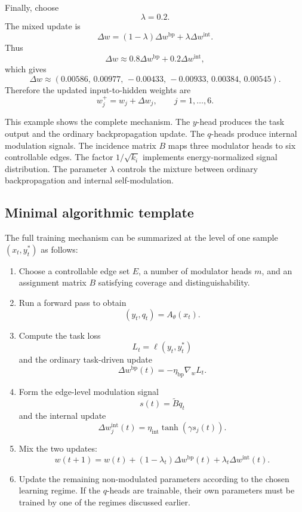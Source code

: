 \documentclass[11pt]{article}
\newcommand{\1}{\mathbf{1}}
\begin{document}
Finally, choose
\[
\lambda=0.2.
\]
The mixed update is
\[
\Delta w
=
(1-\lambda)\Delta w^{\mathrm{bp}}
+
\lambda \Delta w^{\mathrm{int}}.
\]
Thus
\[
\Delta w
\approx
0.8\Delta w^{\mathrm{bp}}
+
0.2\Delta w^{\mathrm{int}},
\]
which gives
\[
\Delta w
\approx
\left(
0.00586,\,
0.00977,\,
-0.00433,\,
-0.00933,\,
0.00384,\,
0.00545
\right).
\]
Therefore the updated input-to-hidden weights are
\[
w_j^+
=
w_j+\Delta w_j,
\qquad
j=1,\dots,6.
\]

This example shows the complete mechanism. The \(y\)-head produces the task output and the ordinary backpropagation update. The \(q\)-heads produce internal modulation signals. The incidence matrix \(B\) maps three modulator heads to six controllable edges. The factor \(1/\sqrt{k_i}\) implements energy-normalized signal distribution. The parameter \(\lambda\) controls the mixture between ordinary backpropagation and internal self-modulation.

\subsection{Minimal algorithmic template}

The full training mechanism can be summarized at the level of one sample \((x_t,y_t^\ast)\) as follows:
\begin{enumerate}[leftmargin=*]
\item Choose a controllable edge set \(E\), a number of modulator heads \(m\), and an assignment matrix \(B\) satisfying coverage and distinguishability.
\item Run a forward pass to obtain
\[
(y_t,q_t)=A_\theta(x_t).
\]
\item Compute the task loss
\[
L_t=\ell(y_t,y_t^\ast)
\]
and the ordinary task-driven update
\[
\Delta w^{\mathrm{bp}}(t)=-\eta_{\mathrm{bp}}\nabla_w L_t.
\]
\item Form the edge-level modulation signal
\[
s(t)=\widetilde B q_t
\]
and the internal update
\[
\Delta w^{\mathrm{int}}_j(t)=\eta_{\mathrm{int}}\tanh(\gamma s_j(t)).
\]
\item Mix the two updates:
\[
w(t+1)=w(t)+(1-\lambda_t)\Delta w^{\mathrm{bp}}(t)+\lambda_t\Delta w^{\mathrm{int}}(t).
\]
\item Update the remaining non-modulated parameters according to the chosen learning regime. If the \(q\)-heads are trainable, their own parameters must be trained by one of the regimes discussed earlier.
\end{enumerate}
\end{document}
